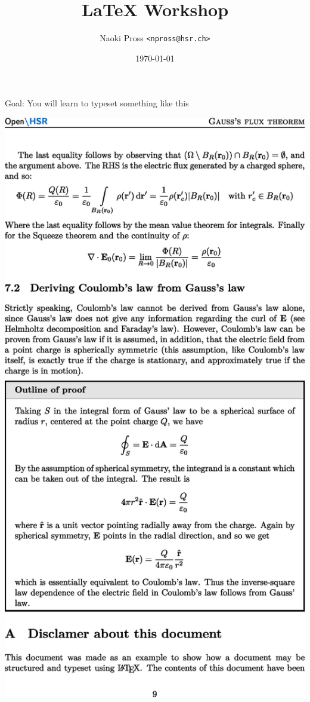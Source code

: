 \documentclass[xetex,mathserif]{beamer}
\title{\textrm{\LaTeX} Workshop}
\author[NaoPross]{Naoki Pross \texttt{<npross@hsr.ch>}}
\date{\today}
\institute[HSR]{Hochschule f\"ur Technik Rapperswil}
\begin{document}
\begin{frame}
\maketitle
\end{frame}

\begin{frame}{Goal: You will learn to typeset something like this}
	\begin{center}
		\includegraphics[width=\linewidth]{figs/gauss-flux}
	\end{center}
\end{frame}
\end{document}
